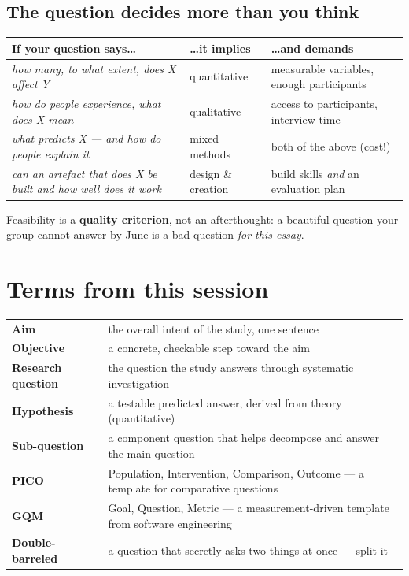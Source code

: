 \documentclass[11pt,a4paper,british,twoside=false,headings=small,chapterprefix=false,numbers=noenddot]{scrbook}
\begin{document}
\subsection{The question decides more than you think}
\begin{center}\small
\small
  \renewcommand{\arraystretch}{1.35}
  \begin{tabular}{@{}p{4.6cm}p{4.0cm}p{4.4cm}@{}}
    \toprule
    \textbf{If your question says\dots} & \textbf{\dots it implies} & \textbf{\dots and demands}\\
    \midrule
    \emph{how many, to what extent, does X affect Y} & quantitative & measurable variables, enough participants\\
    \emph{how do people experience, what does X mean} & qualitative & access to participants, interview time\\
    \emph{what predicts X --- and how do people explain it} & mixed methods & both of the above (cost!)\\
    \emph{can an artefact that does X be built and how well does it work} & design \& creation & build skills \emph{and} an evaluation plan\\
    \bottomrule
  \end{tabular}
  

  Feasibility is a \textbf{quality criterion}, not an afterthought: a
  beautiful question your group cannot answer by June is a bad question
  \emph{for this essay}.
\end{center}


\section*{Terms from this session}
\begin{center}\small
\footnotesize
  \renewcommand{\arraystretch}{1.2}
  \begin{tabular}{@{}p{3.4cm}p{10.1cm}@{}}
    \toprule
    \textbf{Aim} & the overall intent of the study, one sentence\\
    \textbf{Objective} & a concrete, checkable step toward the aim\\
    \textbf{Research question} & the question the study answers through systematic investigation\\
    \textbf{Hypothesis} & a testable predicted answer, derived from theory (quantitative)\\
    \textbf{Sub-question} & a component question that helps decompose and answer the main question\\
    \textbf{PICO} & Population, Intervention, Comparison, Outcome --- a template for comparative questions\\
    \textbf{GQM} & Goal, Question, Metric --- a measurement-driven template from software engineering\\
    \textbf{Double-barreled} & a question that secretly asks two things at once --- split it\\
    \bottomrule
  \end{tabular}
\end{center}
\end{document}
